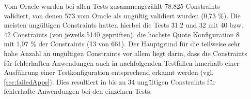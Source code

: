 Vom Oracle wurden bei allen Tests zusammengezählt 78.825 Constraints validiert, von denen 573 vom Oracle als ungültig validiert wurden (0,73 \%).
Die meisten ungültigen Constraints hatten hierbei die Tests 31.2 und 32 mit 40 bzw. 42 Constraints (von jeweils 5140 geprüften), die höchste Quote Konfiguration 8 mit 1,97 \% der Constraints (13 von 661).
Der Hauptgrund für die teilweise sehr hohe Anzahl an ungültigen Constraints vor allem liegt darin, dass die Constraints für fehlerhaften Anwendungen auch in nachfolgenden Testfällen innerhalb einer Ausführung einer Testkonfiguration entsprechend erkannt werden (vgl. \autoref{sec:failedApps}).
Dies resultiert in bis zu 34 ungültigen Constraints für fehlerhafte Anwendungen bei den einzelnen Tests.
